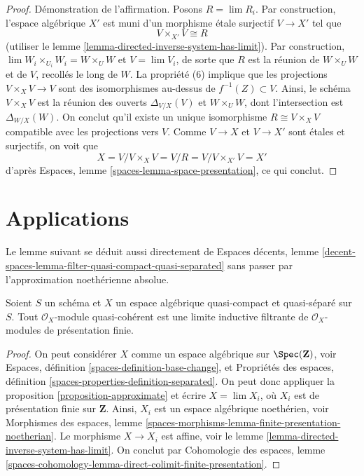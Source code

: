 \begin{proof}
\medskip\noindent
Démonstration de l'affirmation. Posons $R = \lim R_i$.
Par construction, l'espace algébrique $X'$ est
muni d'un morphisme étale surjectif $V \to X'$ tel que
$$
V \times_{X'} V \cong R
$$
(utiliser le lemme \ref{lemma-directed-inverse-system-has-limit}).
Par construction, $\lim W_i \times_{U_i} W_i = W \times_U W$ et $V = \lim V_i$,
de sorte que $R$ est la réunion de $W \times_U W$ et de $V$, recollés le long de $W$.
La propriété (6) implique que les projections $V \times_X V \to V$ sont des isomorphismes
au-dessus de $f^{-1}(Z) \subset V$. Ainsi, le schéma $V \times_X V$ est la réunion
des ouverts $\Delta_{V/X}(V)$ et $W \times_U W$, dont l'intersection
est $\Delta_{W/X}(W)$. On conclut qu'il existe un unique isomorphisme
$R \cong V \times_X V$ compatible avec les projections vers $V$.
Comme $V \to X$ et $V \to X'$ sont étales et surjectifs, on voit que
$$
X = V/ V \times_X V = V/R = V/V \times_{X'} V = X'
$$
d'après Espaces, lemme \ref{spaces-lemma-space-presentation}, ce qui conclut.
\end{proof}




\section{Applications}
\label{section-applications}

\noindent
Le lemme suivant se déduit aussi directement de
Espaces décents, lemme
\ref{decent-spaces-lemma-filter-quasi-compact-quasi-separated}
sans passer par l'approximation noethérienne absolue.

\begin{lemma}
\label{lemma-colimit-finitely-presented}
Soient $S$ un schéma et $X$ un espace algébrique quasi-compact et quasi-séparé
sur $S$. Tout $\mathcal{O}_X$-module quasi-cohérent est une
limite inductive filtrante de $\mathcal{O}_X$-modules de présentation finie.
\end{lemma}

\begin{proof}
On peut considérer $X$ comme un espace algébrique sur $\Spec(\mathbf{Z})$, voir
Espaces, définition \ref{spaces-definition-base-change}, et
Propriétés des espaces, définition \ref{spaces-properties-definition-separated}.
On peut donc appliquer la proposition \ref{proposition-approximate}
et écrire $X = \lim X_i$, où $X_i$ est de présentation finie sur $\mathbf{Z}$.
Ainsi, $X_i$ est un espace algébrique noethérien, voir
Morphismes des espaces, lemme
\ref{spaces-morphisms-lemma-finite-presentation-noetherian}.
Le morphisme $X \to X_i$ est affine, voir le
lemme \ref{lemma-directed-inverse-system-has-limit}.
On conclut par
Cohomologie des espaces, lemme
\ref{spaces-cohomology-lemma-direct-colimit-finite-presentation}.
\end{proof}

